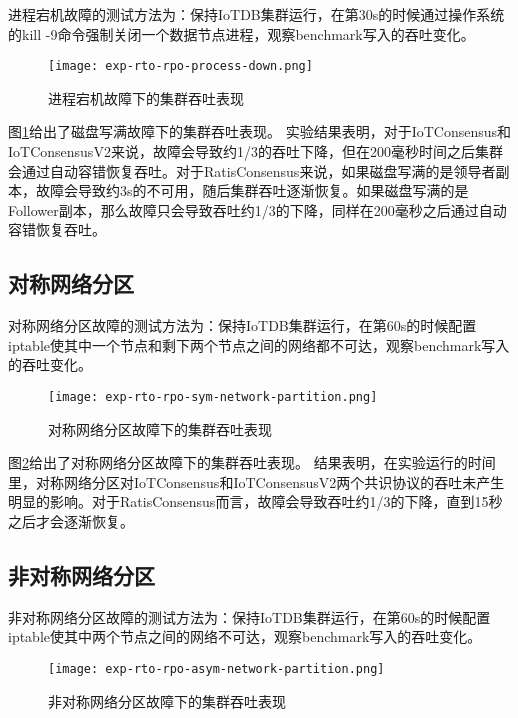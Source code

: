 进程宕机故障的测试方法为：保持IoTDB集群运行，在第30s的时候通过操作系统的kill -9命令强制关闭一个数据节点进程，观察benchmark写入的吞吐变化。


\begin{figure}
    \centering
    \texttt{[image: exp-rto-rpo-process-down.png]}
    \caption{进程宕机故障下的集群吞吐表现}
    \label{fig:exp-rto-rpo-process-down}
\end{figure}

图\ref{fig:exp-rto-rpo-process-down}给出了磁盘写满故障下的集群吞吐表现。
实验结果表明，对于IoTConsensus和IoTConsensusV2来说，故障会导致约1/3的吞吐下降，但在200毫秒时间之后集群会通过自动容错恢复吞吐。对于RatisConsensus来说，如果磁盘写满的是领导者副本，故障会导致约3s的不可用，随后集群吞吐逐渐恢复。如果磁盘写满的是Follower副本，那么故障只会导致吞吐约1/3的下降，同样在200毫秒之后通过自动容错恢复吞吐。


\subsection{对称网络分区}
对称网络分区故障的测试方法为：保持IoTDB集群运行，在第60s的时候配置iptable使其中一个节点和剩下两个节点之间的网络都不可达，观察benchmark写入的吞吐变化。


\begin{figure}
    \centering
    \texttt{[image: exp-rto-rpo-sym-network-partition.png]}
    \caption{对称网络分区故障下的集群吞吐表现}
    \label{fig:exp-rto-rpo-sym-network-partition}
\end{figure}

图\ref{fig:exp-rto-rpo-sym-network-partition}给出了对称网络分区故障下的集群吞吐表现。
结果表明，在实验运行的时间里，对称网络分区对IoTConsensus和IoTConsensusV2两个共识协议的吞吐未产生明显的影响。对于RatisConsensus而言，故障会导致吞吐约1/3的下降，直到15秒之后才会逐渐恢复。

\subsection{非对称网络分区}

非对称网络分区故障的测试方法为：保持IoTDB集群运行，在第60s的时候配置iptable使其中两个节点之间的网络不可达，观察benchmark写入的吞吐变化。


\begin{figure}
    \centering
    \texttt{[image: exp-rto-rpo-asym-network-partition.png]}
    \caption{非对称网络分区故障下的集群吞吐表现}
    \label{fig:exp-rto-rpo-asym-network-partition}
\end{figure}

